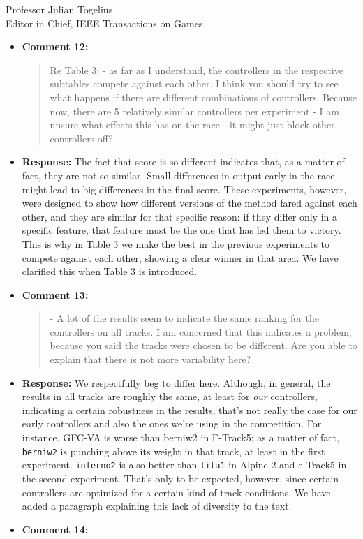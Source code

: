 \documentclass[10pt]{letter} %
\begin{document}
\begin{letter}{Professor Julian Togelius \\ Editor in Chief, IEEE Transactions on Games}
\begin{enumerate}
\begin{itemize}
			\item {\bf Comment 12:}
				\begin{quote}	
					Re Table 3:
					- as far as I understand, the controllers in the respective subtables compete against each other. I think you should try to see what happens if there are different combinations of controllers. Because now, there are 5 relatively similar controllers per experiment - I am unsure what effects this has on the race - it might just block other controllers off?
				\end{quote}
			\item {\bf Response:}
The fact that score is so different indicates that, as a matter of
fact, they are not so similar. Small differences in output early in
the race might lead to big differences in the final score. These
experiments, however, were designed to show how different versions of
the method fared against each other, and they are similar for that
specific reason: if they differ only in a specific feature, that
feature must be the one that has led them to victory. This is why in
Table 3 we make the best in the previous experiments to compete
against each other, showing a clear winner in that area. We have
clarified this when Table 3 is introduced.
			\item {\bf Comment 13:}
				\begin{quote}	
					- A lot of the results seem to indicate the same ranking for the controllers on all tracks. I am concerned that this indicates a problem, because you said the tracks were chosen to be different. Are you able to explain that there is not more variability here?
				\end{quote}	
			\item {\bf Response:} 
We respectfully beg to differ here. Although, in general, the results
in all tracks are roughly the same, at least for {\em our}
controllers, indicating a certain robustness in the results, that's
not really the case for our early controllers and also the ones we're
using in the competition. For instance, GFC-VA is worse than berniw2
in E-Track5; as a matter of fact, {\tt berniw2} is punching above its
weight in that track, at least in the first experiment. {\tt inferno2}
  is also better than {\tt tita1} in Alpine 2 and e-Track5 in the
  second experiment. That's only to be expected, however, since
  certain controllers are optimized for a certain kind of track
  conditions. We have added a paragraph explaining this lack of
  diversity to the text.
			\item {\bf Comment 14:}

\end{itemize}
\end{enumerate}
\end{letter}
\end{document}
